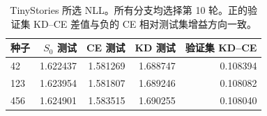 \begin{table}[!t]
\centering
\begin{tabular}{lrrrr}
\toprule
种子 & $S_0$ 测试 & CE 测试 & KD 测试 & 验证集 KD--CE\\
\midrule
42 & 1.622437 & 1.581269 & 1.688747 & 0.108394\\
123 & 1.623954 & 1.581807 & 1.689246 & 0.108082\\
456 & 1.624901 & 1.583515 & 1.690255 & 0.108040\\
\bottomrule
\end{tabular}
\caption{TinyStories 所选 NLL。所有分支均选择第 10 轮。正的验证集 KD--CE 差值与负的 CE 相对测试集增益方向一致。}
\label{tab:ts_endpoints}
\end{table}
